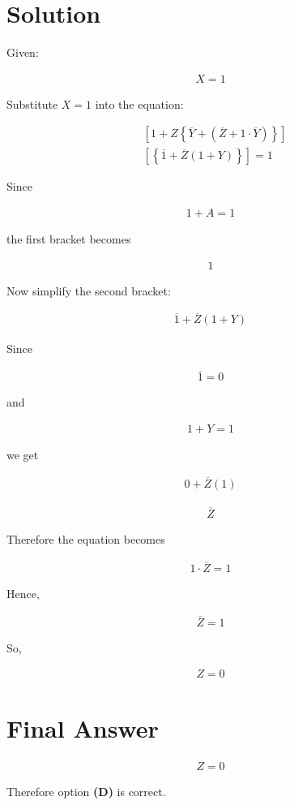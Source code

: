 \documentclass[12pt]{article}
\begin{document}
\vspace{0.5cm}

\section*{Solution}

Given:

\begin{align*}
X=1
\end{align*}

Substitute $X=1$ into the equation:

\begin{align*}
&
\left[
1+Z
\left\{
\overline{Y}
+
\left(
\overline{Z}+1\cdot\overline{Y}
\right)
\right\}
\right]
\\
&
\left[
\left\{
\overline{1}
+
\overline{Z}(1+Y)
\right\}
\right]
=1
\end{align*}

Since

\begin{align*}
1+A=1
\end{align*}

the first bracket becomes

\begin{align*}
1
\end{align*}

Now simplify the second bracket:

\begin{align*}
\overline{1}
+
\overline{Z}(1+Y)
\end{align*}


Since

\begin{align*}
\overline{1}=0
\end{align*}

and

\begin{align*}
1+Y=1
\end{align*}

we get

\begin{align*}
0+\overline{Z}(1)
\end{align*}

\begin{align*}
\overline{Z}
\end{align*}

Therefore the equation becomes

\begin{align*}
1\cdot\overline{Z}=1
\end{align*}

Hence,

\begin{align*}
\overline{Z}=1
\end{align*}

So,

\begin{align*}
Z=0
\end{align*}

\vspace{0.5cm}

\section*{Final Answer}

\begin{align*}
\boxed{Z=0}
\end{align*}

Therefore option \textbf{(D)} is correct.
\end{document}
